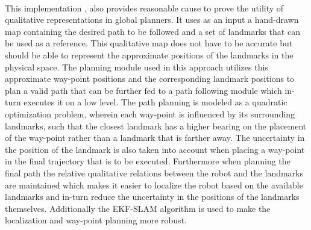 	 \paragraph{}This implementation \cite{shah2011robust}, also provides reasonable cause to prove the utility of qualitative representations in global planners. It uses as an input a hand-drawn map containing the desired path to be followed and a set of landmarks that can be used as a reference. This qualitative map does not have to be accurate but should be able to represent the approximate positions of the landmarks in the physical space. The planning module used in this approach utilizes this approximate way-point positions and the corresponding landmark positions to plan a valid path that can be further fed to a path following module which in-turn executes it on a low level. The path planning is modeled as a quadratic optimization problem, wherein each way-point is influenced by its surrounding landmarks, such that the closest landmark has a higher bearing on the placement of the way-point rather than a landmark that is farther away. The uncertainty in the position of the landmark is also taken into account when placing a way-point in the final trajectory that is to be executed. Furthermore when planning the final path the relative qualitative relations between the robot and the landmarks are maintained which makes it easier to localize the robot based on the available landmarks and in-turn reduce the uncertainty in the positions of the landmarks themselves. Additionally the EKF-SLAM algorithm is used to make the localization and way-point planning more robust.

